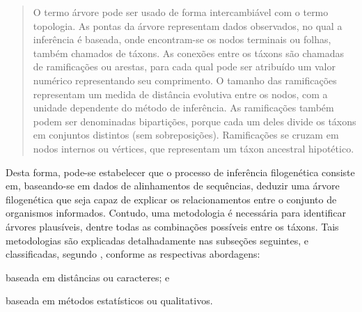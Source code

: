 \documentclass[english,brazilian]{UNISINOSmonografia} %
\begin{document}


\begin{quote}
	O termo árvore pode ser usado de forma intercambiável com o termo topologia.
	As pontas da árvore representam dados observados, no qual a inferência é baseada, onde encontram-se os nodos terminais ou folhas, também chamados de táxons.
	As conexões entre os táxons são chamadas de ramificações ou arestas, para cada qual pode ser atribuído um valor numérico representando seu comprimento.
	O tamanho das ramificações representam um medida de distância evolutiva entre os nodos, com a unidade dependente do método de inferência.
	As ramificações também podem ser denominadas bipartições, porque cada um deles divide os táxons em conjuntos distintos (sem sobreposições).
	Ramificações se cruzam em nodos internos ou vértices, que representam um táxon ancestral hipotético.
\end{quote}


Desta forma, pode-se estabelecer que o processo de inferência filogenética consiste em, baseando-se em dados de alinhamentos de sequências, deduzir uma árvore filogenética que seja capaz de explicar os relacionamentos entre o conjunto de organismos informados.
Contudo, uma metodologia é necessária para identificar árvores plausíveis, dentre todas as combinações possíveis entre os táxons.
Tais metodologias são explicadas detalhadamente nas subseções seguintes, e classificadas, segundo , conforme as respectivas abordagens: 
\begin{inparaenum} 
	\item baseada em distâncias ou caracteres; e
	\item baseada em métodos estatísticos ou qualitativos.
\end{inparaenum}
\end{document}
